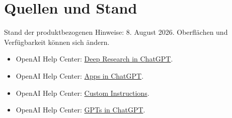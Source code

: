 \chapter{Quellen und Stand}
Stand der produktbezogenen Hinweise: 8. August 2026. Oberflächen und Verfügbarkeit können sich ändern.
\begin{itemize}
\item OpenAI Help Center: \href{https://help.openai.com/en/articles/10500283-deep-research}{Deep Research in ChatGPT}.
\item OpenAI Help Center: \href{https://help.openai.com/en/articles/11487775-connectors-in}{Apps in ChatGPT}.
\item OpenAI Help Center: \href{https://help.openai.com/en/articles/8096356-custom-instructions-for-chatgpt}{Custom Instructions}.
\item OpenAI Help Center: \href{https://help.openai.com/en/articles/8554407}{GPTs in ChatGPT}.
\end{itemize}
